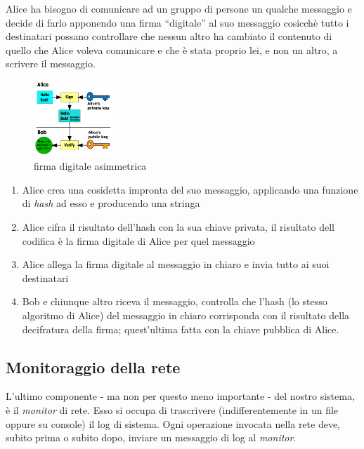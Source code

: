 \documentclass[
]{article}
\providecommand{\tightlist}{%
  \setlength{\itemsep}{0pt}\setlength{\parskip}{0pt}}
\begin{document}
Alice ha bisogno di comunicare ad un gruppo di persone un qualche
messaggio e decide di farlo apponendo una firma ``digitale'' al suo
messaggio cosicchè tutto i destinatari possano controllare che nessun
altro ha cambiato il contenuto di quello che Alice voleva comunicare e
che è stata proprio lei, e non un altro, a scrivere il messaggio.

\begin{figure}
\centering
\includegraphics[width=3cm]{../assets/220px-Illustration_of_digital_signature.svg.png}
\caption{firma digitale asimmetrica}
\end{figure}

\begin{enumerate}
\def\labelenumi{\arabic{enumi}.}
\tightlist
\item
  Alice crea una cosidetta impronta del suo messaggio, applicando una
  funzione di \emph{hash} ad esso e producendo una stringa
\item
  Alice cifra il risultato dell'hash con la sua chiave privata, il
  risultato dell codifica è la firma digitale di Alice per quel
  messaggio
\item
  Alice allega la firma digitale al messaggio in chiaro e invia tutto ai
  suoi destinatari
\item
  Bob e chiunque altro riceva il messaggio, controlla che l'hash (lo
  stesso algoritmo di Alice) del messaggio in chiaro corrisponda con il
  risultato della decifratura della firma; quest'ultima fatta con la
  chiave pubblica di Alice.
\end{enumerate}

\hypertarget{monitoraggio-della-rete}{%
\subsection{Monitoraggio della rete}\label{monitoraggio-della-rete}}

L'ultimo componente - ma non per questo meno importante - del nostro
sistema, è il \emph{monitor} di rete. Esso si occupa di trascrivere
(indifferentemente in un file oppure su console) il log di sistema. Ogni
operazione invocata nella rete deve, subito prima o subito dopo, inviare
un messaggio di log al \emph{monitor}.
\end{document}
